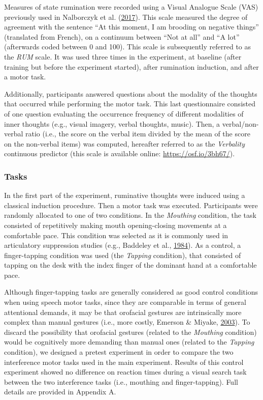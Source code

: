\documentclass[a4paper,12pt,twoside,openright,oldfontcommands]{memoir}
\begin{document}
Measures of state rumination were recorded using a Visual Analogue Scale (VAS) previously used in Nalborczyk et al. (\protect\hyperlink{ref-nalborczyk_orofacial_2017}{2017}). This scale measured the degree of agreement with the sentence \enquote{At this moment, I am brooding on negative things} (translated from French), on a continuum between \enquote{Not at all} and \enquote{A lot} (afterwards coded between 0 and 100). This scale is subsequently referred to as the \emph{RUM} scale. It was used three times in the experiment, at baseline (after training but before the experiment started), after rumination induction, and after a motor task.

Additionally, participants answered questions about the modality of the thoughts that occurred while performing the motor task. This last questionnaire consisted of one question evaluating the occurrence frequency of different modalities of inner thoughts (e.g., visual imagery, verbal thoughts, music). Then, a verbal/non-verbal ratio (i.e., the score on the verbal item divided by the mean of the score on the non-verbal items) was computed, hereafter referred to as the \emph{Verbality} continuous predictor (this scale is available online: \url{https://osf.io/3bh67/}).

\hypertarget{tasks}{%
\subsubsection{Tasks}\label{tasks}}

In the first part of the experiment, ruminative thoughts were induced using a classical induction procedure. Then a motor task was executed. Participants were randomly allocated to one of two conditions. In the \emph{Mouthing} condition, the task consisted of repetitively making mouth opening-closing movements at a comfortable pace. This condition was selected as it is commonly used in articulatory suppression studies (e.g., Baddeley et al., \protect\hyperlink{ref-baddeley_exploring_1984}{1984}). As a control, a finger-tapping condition was used (the \emph{Tapping} condition), that consisted of tapping on the desk with the index finger of the dominant hand at a comfortable pace.

Although finger-tapping tasks are generally considered as good control conditions when using speech motor tasks, since they are comparable in terms of general attentional demands, it may be that orofacial gestures are intrinsically more complex than manual gestures (i.e., more costly, Emerson \& Miyake, \protect\hyperlink{ref-emerson_role_2003}{2003}). To discard the possibility that orofacial gestures (related to the \emph{Mouthing} condition) would be cognitively more demanding than manual ones (related to the \emph{Tapping} condition), we designed a pretest experiment in order to compare the two interference motor tasks used in the main experiment. Results of this control experiment showed no difference on reaction times during a visual search task between the two interference tasks (i.e., mouthing and finger-tapping). Full details are provided in Appendix A.
\end{document}
